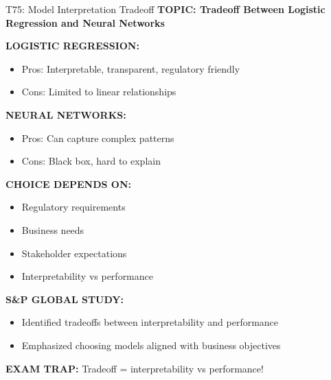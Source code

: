 \documentclass[8pt]{beamer}
\begin{document}
	\begin{frame}{T75: Model Interpretation Tradeoff}
		\fontsize{6.5}{7.5}\selectfont
		\textbf{TOPIC: Tradeoff Between Logistic Regression and Neural Networks}
		
		\vspace{0.1cm}
		\textbf{LOGISTIC REGRESSION:}
		\begin{itemize}
			\item \textcolor{myblue}{Pros:} Interpretable, transparent, regulatory friendly
			\item \textcolor{myblue}{Cons:} Limited to linear relationships
		\end{itemize}
		
		\vspace{0.1cm}
		\textbf{NEURAL NETWORKS:}
		\begin{itemize}
			\item \textcolor{myblue}{Pros:} Can capture complex patterns
			\item \textcolor{myblue}{Cons:} Black box, hard to explain
		\end{itemize}
		
		\vspace{0.1cm}
		\textbf{CHOICE DEPENDS ON:}
		\begin{itemize}
			\item Regulatory requirements
			\item Business needs
			\item Stakeholder expectations
			\item Interpretability vs performance
		\end{itemize}
		
		\vspace{0.1cm}
		\textbf{S\&P GLOBAL STUDY:}
		\begin{itemize}
			\item Identified tradeoffs between interpretability and performance
			\item Emphasized choosing models aligned with business objectives
		\end{itemize}
		
		\textcolor{myred}{\textbf{EXAM TRAP:}} Tradeoff = \textcolor{myblue}{interpretability vs performance}!
	\end{frame}
	
\end{document}
